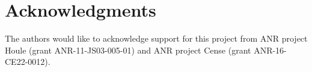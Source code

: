 \documentclass[natbib,smallextended]{svjour3}
\begin{document}
\section{Acknowledgments}
The authors would like to acknowledge support for this project
from ANR project Houle (grant ANR-11-JS03-005-01) and ANR project Cense (grant ANR-16-CE22-0012).







%
%
%

%
%
\end{document}
